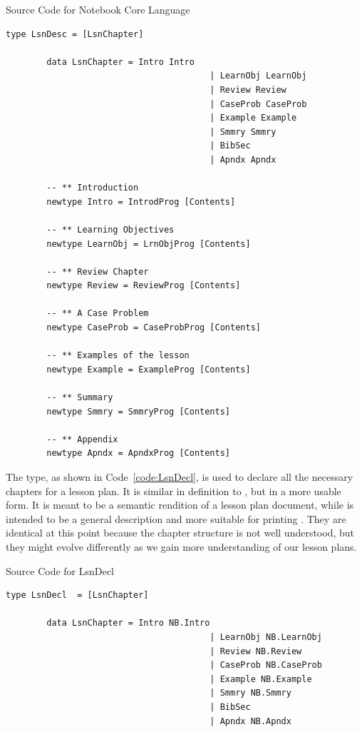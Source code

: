 \begin{listing}[h!]
	\caption{Source Code for Notebook Core Language}
	\label{code:core}
	\begin{lstlisting}[language=haskell1]		
		type LsnDesc = [LsnChapter]

		data LsnChapter = Intro Intro
										| LearnObj LearnObj
										| Review Review
										| CaseProb CaseProb
										| Example Example
										| Smmry Smmry
										| BibSec
										| Apndx Apndx
		
		-- ** Introduction
		newtype Intro = IntrodProg [Contents]
		
		-- ** Learning Objectives
		newtype LearnObj = LrnObjProg [Contents]
		
		-- ** Review Chapter
		newtype Review = ReviewProg [Contents]
		
		-- ** A Case Problem
		newtype CaseProb = CaseProbProg [Contents]
		
		-- ** Examples of the lesson
		newtype Example = ExampleProg [Contents]
		
		-- ** Summary
		newtype Smmry = SmmryProg [Contents]
		
		-- ** Appendix
		newtype Apndx = ApndxProg [Contents]
	\end{lstlisting}
\end{listing}

The  type, as shown in Code~\ref{code:LsnDecl}, is used to 
declare all the necessary chapters for a lesson plan. It is similar in 
definition to , but in a more usable form. It is meant to be a 
semantic rendition of a lesson plan document, while  is 
intended to be a general description and more suitable for printing 
\cite{lsnDeclandlsnDesc}. They are identical at this point because the chapter 
structure is not well understood, but they might evolve differently as we gain 
more understanding of our lesson plans.

\begin{listing}[h]
	\caption{Source Code for LsnDecl}
	\label{code:LsnDecl}
	\begin{lstlisting}[language=haskell1]
		type LsnDecl  = [LsnChapter]
		
		data LsnChapter = Intro NB.Intro
										| LearnObj NB.LearnObj
										| Review NB.Review
										| CaseProb NB.CaseProb
										| Example NB.Example
										| Smmry NB.Smmry
										| BibSec
										| Apndx NB.Apndx
	\end{lstlisting}
\end{listing}


